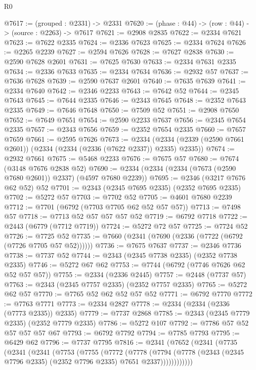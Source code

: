 \begin{lexlean}{R0}
\begin{coremodule}
@7617 := (grouped : @2331) -> @2331
@7620 := (phase : @44) -> (row : @44) -> (source : @2263) -> @7617
@7621 := @2908 @2835
@7622 := @2334 @7621
@7623 := @7622 @2335
@7624 := @2336 @7623
@7625 := @2334 @7624
@7626 := @2265 @2239
@7627 := @2594 @7626
@7628 := @7627 @2838
@7630 := @2590 @7628 @2601
@7631 := @7625 @7630
@7633 := @2334 @7631 @2335
@7634 := @2336 @7633
@7635 := @2334 @7634
@7636 := @2932 @57
@7637 := @7636 @7628
@7639 := @2590 @7637 @2601
@7640 := @7635 @7639
@7641 := @2334 @7640
@7642 := @2346 @2233
@7643 := @7642 @52
@7644 := @2345 @7643
@7645 := @7644 @2335
@7646 := @2343 @7645
@7648 := @2352 @7643 @2335
@7649 := @7646 @7648
@7650 := @7509 @52
@7651 := @2908 @7650
@7652 := @7649 @7651
@7654 := @2590 @2233 @7637
@7656 := @2345 @7654 @2335
@7657 := @2343 @7656
@7659 := @2352 @7654 @2335
@7660 := @7657 @7659
@7661 := @2595 @7626
@7673 := @2334 (@2334 (@2339 (@2590 @7661 @2601)) (@2334 (@2334 (@2336 (@7622 @2337)) @2335) @2335))
@7674 := @2932 @7661
@7675 := @5468 @2233
@7676 := @7675 @57
@7680 := @7674 (@3148 @7676 @2838 @52)
@7690 := @2334 (@2334 (@2334 (@7673 (@2590 @7680 @2601)) @2337) (@4597 @7680 @2239))
@7695 := @2346 (@3217 @7676 @62 @52) @52
@7701 := @2343 (@2345 @7695 @2335) (@2352 @7695 @2335)
@7702 := @5272 @57
@7703 := @7702 @52
@7705 := @4601 @7680 @2239
@7712 := @7701 (@6792 (@7703 @7705 @62 @52 @57 @57))
@7713 := @7498 @57
@7718 := @7713 @52 @57 @57 @57 @52
@7719 := @6792 @7718
@7722 := @2443 (@6779 (@7712 @7719))
@7724 := @5272 @72 @57
@7725 := @7724 @52
@7726 := @7725 @52
@7735 := @7660 (@2341 (@7690 (@2336 (@7722 (@6792 (@7726 @7705 @57 @52))))))
@7736 := @7675 @7637
@7737 := @2346 @7736
@7738 := @7737 @52
@7744 := @2343 (@2345 @7738 @2335) (@2352 @7738 @2335)
@7746 := @5272 @67 @62
@7753 := @7744 (@6792 (@7746 @7626 @62 @52 @57 @57))
@7755 := @2334 (@2336 @2445)
@7757 := @2448 (@7737 @57)
@7763 := @2343 (@2345 @7757 @2335) (@2352 @7757 @2335)
@7765 := @5272 @62 @57
@7770 := @7765 @52 @62 @52 @57 @52
@7771 := @6792 @7770
@7772 := @7763 @7771
@7773 := @2334 @2827
@7778 := @2334 (@2334 (@2336 (@7773 @2335)) @2335)
@7779 := @7737 @2868
@7785 := @2343 (@2345 @7779 @2335) (@2352 @7779 @2335)
@7786 := @5272 @107
@7792 := @7786 @57 @52 @57 @57 @57 @67
@7793 := @6792 @7792
@7794 := @7785 @7793
@7795 := @6429 @62
@7796 := @7737 @7795
@7816 := @2341
    (@7652
      (@2341
        (@7735
          (@2341
            (@2341
              (@7753
                (@7755
                  (@7772
                    (@7778
                      (@7794
                        (@7778
                          (@2343 (@2345 @7796 @2335) (@2352 @7796 @2335) @7651 @2337))))))))))))

\end{coremodule}
\end{lexlean}

